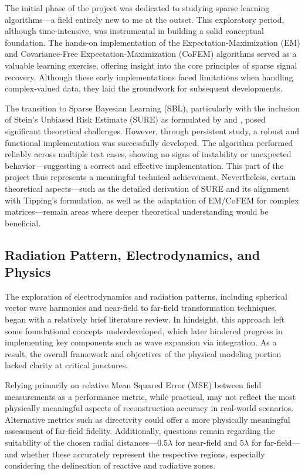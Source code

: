 \documentclass{article}
\begin{document}
The initial phase of the project was dedicated to studying sparse learning algorithms—a field entirely new to me at the outset. This exploratory period, although time-intensive, was instrumental in building a solid conceptual foundation. The hands-on implementation of the Expectation-Maximization (EM) and Covariance-Free Expectation-Maximization (CoFEM) algorithms served as a valuable learning exercise, offering insight into the core principles of sparse signal recovery. Although these early implementations faced limitations when handling complex-valued data, they laid the groundwork for subsequent developments.

The transition to Sparse Bayesian Learning (SBL), particularly with the inclusion of Stein’s Unbiased Risk Estimate (SURE) as formulated by \citet{slockSURE} and \citet{tipp2003fastsb}, posed significant theoretical challenges. However, through persistent study, a robust and functional implementation was successfully developed. The algorithm performed reliably across multiple test cases, showing no signs of instability or unexpected behavior—suggesting a correct and effective implementation. This part of the project thus represents a meaningful technical achievement. Nevertheless, certain theoretical aspects—such as the detailed derivation of SURE and its alignment with Tipping’s formulation, as well as the adaptation of EM/CoFEM for complex matrices—remain areas where deeper theoretical understanding would be beneficial.

\subsection{Radiation Pattern, Electrodynamics, and Physics}

The exploration of electrodynamics and radiation patterns, including spherical vector wave harmonics and near-field to far-field transformation techniques, began with a relatively brief literature review. In hindsight, this approach left some foundational concepts underdeveloped, which later hindered progress in implementing key components such as wave expansion via integration. As a result, the overall framework and objectives of the physical modeling portion lacked clarity at critical junctures.

Relying primarily on relative Mean Squared Error (MSE) between field measurements as a performance metric, while practical, may not reflect the most physically meaningful aspects of reconstruction accuracy in real-world scenarios. Alternative metrics such as directivity could offer a more physically meaningful assessment of far-field fidelity. Additionally, questions remain regarding the suitability of the chosen radial distances—$0.5\lambda$ for near-field and $5\lambda$ for far-field—and whether these accurately represent the respective regions, especially considering the delineation of reactive and radiative zones.
\end{document}
